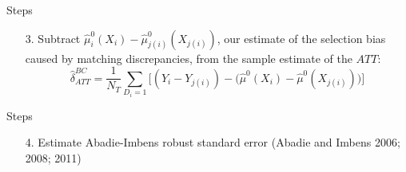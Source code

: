 \documentclass{beamer}
\begin{document}
\begin{frame}{Steps}

\begin{enumerate}
\item[3. ] Subtract $ \widehat{\mu}_i^0(X_i) - \widehat{\mu}_{j(i)}^0(X_{j(i)})$, our estimate of the selection bias caused by matching discrepancies, from the sample estimate of the $ATT$: $$\widehat{\delta}_{ATT}^{BC} = \dfrac{1}{N_T} \sum_{D_i=1} \bigg [ (Y_i - Y_{j(i)}) - \Big(\widehat{\mu}^0(X_i) - \widehat{\mu}^0(X_{j(i)})\Big) \bigg ]$$
\end{enumerate}

\end{frame}


\begin{frame}{Steps}

\begin{enumerate}
\item[4. ] Estimate Abadie-Imbens robust standard error (Abadie and Imbens 2006; 2008; 2011)
\end{enumerate}

\end{frame}
\end{document}
